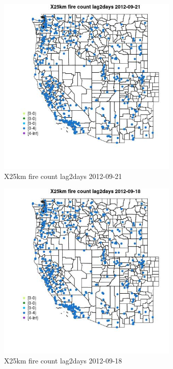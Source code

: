 \begin{figure} 
\centering  
\includegraphics[width=0.77\textwidth]{Code_Outputs/Report_ML_input_PM25_Step4_part_e_de_duplicated_aves_compiled_2019-05-14wNAs_MapObsX25km_fire_count_lag2days2012-09-21.jpg} 
\caption{\label{fig:Report_ML_input_PM25_Step4_part_e_de_duplicated_aves_compiled_2019-05-14wNAsMapObsX25km_fire_count_lag2days2012-09-21}X25km fire count lag2days 2012-09-21} 
\end{figure} 
 

\begin{figure} 
\centering  
\includegraphics[width=0.77\textwidth]{Code_Outputs/Report_ML_input_PM25_Step4_part_e_de_duplicated_aves_compiled_2019-05-14wNAs_MapObsX25km_fire_count_lag2days2012-09-18.jpg} 
\caption{\label{fig:Report_ML_input_PM25_Step4_part_e_de_duplicated_aves_compiled_2019-05-14wNAsMapObsX25km_fire_count_lag2days2012-09-18}X25km fire count lag2days 2012-09-18} 
\end{figure} 
 

